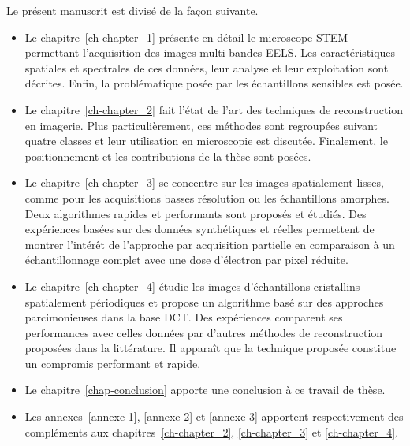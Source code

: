 Le présent manuscrit est divisé de la façon suivante.
\begin{itemize}
    \item Le chapitre~\ref{ch-chapter_1} présente en détail le microscope STEM permettant l'acquisition des images multi-bandes EELS. Les caractéristiques spatiales et spectrales de ces données, leur analyse et leur exploitation sont décrites. Enfin, la problématique posée par les échantillons sensibles  est posée.
    \item Le chapitre~\ref{ch-chapter_2} fait l'état de l'art des techniques de reconstruction en imagerie. Plus particulièrement, ces méthodes sont regroupées suivant quatre classes et leur utilisation en microscopie est discutée. Finalement, le positionnement et les contributions de la thèse sont posées.
    \item Le chapitre~\ref{ch-chapter_3} se concentre sur les images spatialement lisses, comme pour les acquisitions basses résolution ou les échantillons amorphes. Deux algorithmes rapides et performants sont proposés et étudiés. Des expériences basées sur des données synthétiques et réelles permettent de montrer l'intérêt de l'approche par acquisition partielle en comparaison à un échantillonnage complet avec une dose d'électron par pixel réduite.
    \item Le chapitre~\ref{ch-chapter_4} étudie les images d'échantillons cristallins spatialement périodiques et propose un algorithme basé sur des approches parcimonieuses dans la base DCT. Des expériences comparent ses performances avec celles données par d'autres méthodes de reconstruction proposées dans la littérature. Il apparaît que la technique proposée constitue un compromis performant et rapide.
    \item Le chapitre~\ref{chap-conclusion} apporte une conclusion à ce travail de thèse.
    \item Les annexes~\ref{annexe-1}, \ref{annexe-2} et \ref{annexe-3} apportent respectivement des compléments aux chapitres~\ref{ch-chapter_2}, \ref{ch-chapter_3} et \ref{ch-chapter_4}.
\end{itemize} 
 
 
 
 





